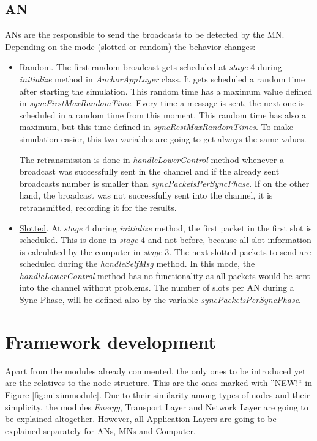\subsection{\ac{AN}}

\acp{AN} are the responsible to send the broadcasts to be detected by the \ac{MN}. Depending on the mode (slotted or random) the 
behavior changes:
\begin{itemize}
 \item \underline{Random}. The first random broadcast gets scheduled at \textit{stage} 4 during \textit{initialize} method in \textit{AnchorAppLayer}
class. It gets scheduled a random time after starting the simulation. This random time has a maximum value defined in 
\textit{syncFirstMaxRandomTime}. Every time a message is sent, the next one is scheduled in a random time from this moment. This random 
time has also a maximum, but this time defined in \textit{syncRestMaxRandomTimes}. To make simulation easier, this two variables are going to get
always the same values.

The retransmission is done in \textit{handleLowerControl}
method whenever a broadcast was successfully sent in the channel and if the already sent broadcasts number is smaller than 
\textit{syncPacketsPerSyncPhase}. If on the other hand, the broadcast was not successfully sent into the channel, it is retransmitted, recording
it for the results.
 \item \underline{Slotted}. At \textit{stage} 4 during \textit{initialize} method, the first packet in the first slot is scheduled. This is done
in \textit{stage} 4 and not before, because all slot information is calculated by the computer in \textit{stage} 3. The next slotted packets to
send are scheduled during the \textit{handleSelfMsg} method. In this mode, the \textit{handleLowerControl} method has no functionality as all 
packets would be sent into the channel without problems. The number of slots per \ac{AN} during a Sync Phase, will be defined also by the variable 
\textit{syncPacketsPerSyncPhase}.
\end{itemize}


\section{Framework development}
\label{sec:frameworkdevelopment}

Apart from the modules already commented, the only ones to be introduced yet are the relatives to the node structure. This are the ones marked
with ''NEW$!$`` in Figure \ref{fig:miximmodule}. Due to their similarity among types of nodes and their simplicity, the modules 
\textit{Energy}, Transport Layer and Network Layer are going to be explained altogether. However, all Application Layers are going to be 
explained separately for \acp{AN}, \acp{MN} and Computer.

